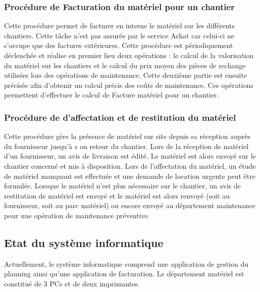 	\subsubsection{Procédure de Facturation du matériel pour un chantier}
Cette procédure permet de facturer en interne le matériel sur les différents chantiers. Cette tâche n’est pas assurée par le service Achat car celui-ci ne s’occupe que des factures extérieures.
Cette procédure est périodiquement déclenchée et réalise en premier lieu deux opérations : le calcul de la valorisation du matériel sur les chantiers et le calcul du prix moyen des pièces de rechange utilisées lors des opérations de maintenance. Cette deuxième partie est ensuite précisée afin d’obtenir un calcul précis des coûts de maintenance.
Ces opérations permettent d’effectuer le calcul de Facture matériel pour un chantier.

		
	\subsubsection{Procédure de d’affectation et de restitution du matériel}
Cette procédure gère la présence de matériel sur site depuis sa réception auprès du fournisseur jusqu’à s on retour du chantier.
Lors de la réception  de matériel d’un fournisseur, un avis de livraison est édité. Le matériel est alors envoyé sur le chantier concerné et mis à disposition. Lors de l’affectation du matériel, un étude de matériel manquant est effectuée et une demande de location urgente peut être formulée. Lorsque le matériel n’est plus nécessaire sur le chantier, un avis de restitution de matériel est envoyé et le matériel est alors renvoyé (soit au fournisseur, soit au parc matériel) ou encore envoyé au département maintenance pour une opération de maintenance préventive.

\subsection{Etat du système informatique}
Actuellement, le système informatique comprend une application de gestion du planning ainsi qu’une application de facturation.
Le département matériel est constitué de 3 PCs et de deux imprimantes.


